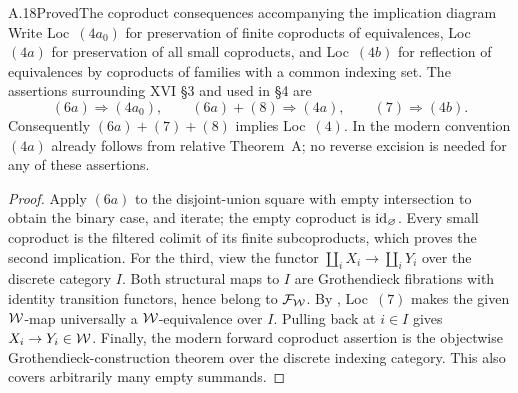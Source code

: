 \begin{claim}{A.18}{Proved}{The coproduct consequences accompanying the implication diagram}
Write Loc~$(4a_0)$ for preservation of finite coproducts of equivalences, Loc~$(4a)$ for preservation of all small coproducts, and Loc~$(4b)$ for reflection of equivalences by coproducts of families with a common indexing set. The assertions surrounding XVI \S3 and used in \S4 are
\[
(6a)\Rightarrow(4a_0),\qquad
(6a)+(8)\Rightarrow(4a),\qquad
(7)\Rightarrow(4b).
\]
Consequently $(6a)+(7)+(8)$ implies Loc~$(4)$. In the modern convention $(4a)$ already follows from relative Theorem~A; no reverse excision is needed for any of these assertions.
\end{claim}
\begin{proof}
Apply $(6a)$ to the disjoint-union square with empty intersection to obtain the binary case, and iterate; the empty coproduct is $\mathrm{id}_\varnothing$. Every small coproduct is the filtered colimit of its finite subcoproducts, which proves the second implication. For the third, view the functor $\coprod_iX_i\to\coprod_iY_i$ over the discrete category $I$. Both structural maps to $I$ are Grothendieck fibrations with identity transition functors, hence belong to $\mathcal F_{\mathcal{W}}$. By , Loc~$(7)$ makes the given $\mathcal{W}$-map universally a $\mathcal{W}$-equivalence over $I$. Pulling back at $i\in I$ gives $X_i\to Y_i\in\mathcal{W}$. Finally, the modern forward coproduct assertion is the objectwise Grothendieck-construction theorem over the discrete indexing category. This also covers arbitrarily many empty summands.
\end{proof}

